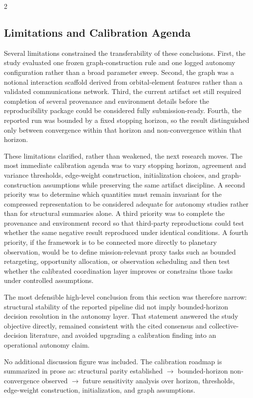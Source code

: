 \documentclass[fleqn,10pt,letterpaper]{article}
\begin{document}
\begin{multicols}{2}
\subsection{Limitations and Calibration Agenda}

Several limitations constrained the transferability of these conclusions. First, the study evaluated one frozen graph-construction rule and one logged autonomy configuration rather than a broad parameter sweep. Second, the graph was a notional interaction scaffold derived from orbital-element features rather than a validated communications network. Third, the current artifact set still required completion of several provenance and environment details before the reproducibility package could be considered fully submission-ready. Fourth, the reported run was bounded by a fixed stopping horizon, so the result distinguished only between convergence within that horizon and non-convergence within that horizon.

These limitations clarified, rather than weakened, the next research moves. The most immediate calibration agenda was to vary stopping horizon, agreement and variance thresholds, edge-weight construction, initialization choices, and graph-construction assumptions while preserving the same artifact discipline. A second priority was to determine which quantities must remain invariant for the compressed representation to be considered adequate for autonomy studies rather than for structural summaries alone. A third priority was to complete the provenance and environment record so that third-party reproductions could test whether the same negative result reproduced under identical conditions. A fourth priority, if the framework is to be connected more directly to planetary observation, would be to define mission-relevant proxy tasks such as bounded retargeting, opportunity allocation, or observation scheduling and then test whether the calibrated coordination layer improves or constrains those tasks under controlled assumptions.

The most defensible high-level conclusion from this section was therefore narrow: structural stability of the reported pipeline did not imply bounded-horizon decision resolution in the autonomy layer. That statement answered the study objective directly, remained consistent with the cited consensus and collective-decision literature, and avoided upgrading a calibration finding into an operational autonomy claim.

No additional discussion figure was included. The calibration roadmap is summarized in prose as: structural parity established $\rightarrow$ bounded-horizon non-convergence observed $\rightarrow$ future sensitivity analysis over horizon, thresholds, edge-weight construction, initialization, and graph assumptions.



\end{multicols}
\end{document}
